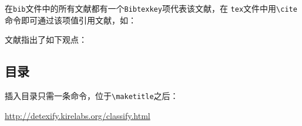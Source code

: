 在\texttt{bib}文件中的所有文献都有一个\texttt{Bibtexkey}项代表该文献，在
\texttt{tex}文件中用\verb!\cite!命令即可通过该项值引用文献，如：

\begin{code}
  文献\cite{Wu2010}指出了如下观点：
\end{code}

\subsection{目录}

插入目录只需一条命令，位于\verb!\maketitle!之后：

\begin{code}
  \tableofcontents
\end{code}

\url{http://detexify.kirelabs.org/classify.html}
